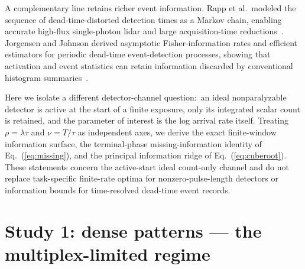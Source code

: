 \documentclass[10pt,twocolumn]{article}
\begin{document}
A complementary line retains richer event information. Rapp et al.\
modeled the sequence of dead-time-distorted detection times as a Markov
chain, enabling accurate high-flux single-photon lidar and large
acquisition-time reductions~\cite{rapp2021highflux}. Jorgensen and
Johnson derived asymptotic Fisher-information rates and efficient
estimators for periodic dead-time event-detection processes, showing that
activation and event statistics can retain information discarded by
conventional histogram summaries~\cite{jorgensen2026deadtime}.

Here we isolate a different detector-channel question:\ an ideal
nonparalyzable detector is active at the start of a finite exposure, only
its integrated scalar count is retained, and the parameter of interest is
the log arrival rate itself. Treating $\rho = \lambda\tau$ and
$\nu = T/\tau$ as independent axes, we derive the exact finite-window
information surface, the terminal-phase missing-information identity of
Eq.~(\ref{eq:missing}), and the principal information ridge of
Eq.~(\ref{eq:cuberoot}). These statements concern the active-start ideal
count-only channel and do not replace task-specific finite-rate optima
for nonzero-pulse-length detectors or information bounds for
time-resolved dead-time event records.

\section{Study 1: dense patterns --- the multiplex-limited regime}
\label{sec:study1}
\end{document}
